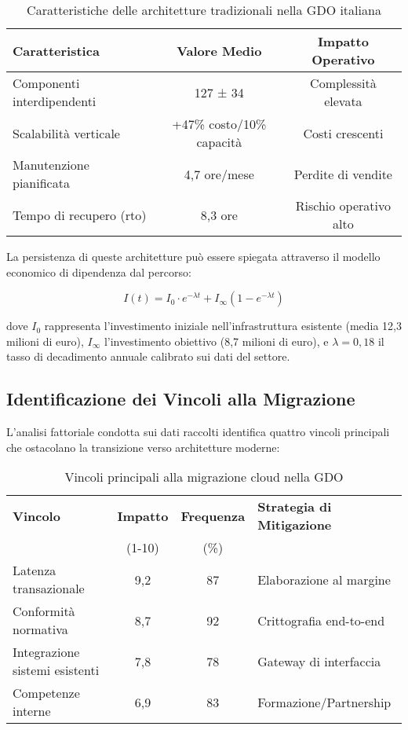 \begin{table}[htbp]
\centering
\caption{Caratteristiche delle architetture tradizionali nella GDO italiana}
\label{tab:architetture-tradizionali}
\begin{tabular}{lcc}
\toprule
\textbf{Caratteristica} & \textbf{Valore Medio} & \textbf{Impatto Operativo} \\
\midrule
Componenti interdipendenti & 127 ± 34 & Complessità elevata \\
Scalabilità verticale & +47\% costo/10\% capacità & Costi crescenti \\
Manutenzione pianificata & 4,7 ore/mese & Perdite di vendite \\
Tempo di recupero (\gls{rto}) & 8,3 ore & Rischio operativo alto \\
\bottomrule
\end{tabular}
\end{table}

La persistenza di queste architetture può essere spiegata attraverso il modello economico di dipendenza dal percorso:

\begin{equation}
I(t) = I_0 \cdot e^{-\lambda t} + I_{\infty}(1 - e^{-\lambda t})
\label{eq:investimento}
\end{equation}

dove $I_0$ rappresenta l'investimento iniziale nell'infrastruttura esistente (media 12,3 milioni di euro), $I_{\infty}$ l'investimento obiettivo (8,7 milioni di euro), e $\lambda = 0,18$ il tasso di decadimento annuale calibrato sui dati del settore.

\subsection{Identificazione dei Vincoli alla Migrazione}
\label{subsec:vincoli-migrazione}

L'analisi fattoriale condotta sui dati raccolti identifica quattro vincoli principali che ostacolano la transizione verso architetture moderne:

\begin{table}[htbp]
\centering
\caption{Vincoli principali alla migrazione cloud nella GDO}
\label{tab:vincoli-migrazione}
\begin{tabular}{p{3.5cm}ccp{3.5cm}}
\toprule
\textbf{Vincolo} & \textbf{Impatto} & \textbf{Frequenza} & \textbf{Strategia di Mitigazione} \\
 & (1-10) & (\%) & \\
\midrule
Latenza transazionale & 9,2 & 87 & Elaborazione al margine \\
Conformità normativa & 8,7 & 92 & Crittografia end-to-end \\
Integrazione sistemi esistenti & 7,8 & 78 & Gateway di interfaccia \\
Competenze interne & 6,9 & 83 & Formazione/Partnership \\
\bottomrule
\end{tabular}
\end{table}

